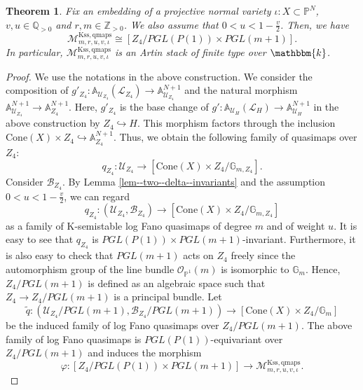 \documentclass[12pt,twoside]{amsart}
\newtheorem{thm}{Theorem}[section]
\theoremstyle{definition}
\begin{document}
\begin{thm}\label{thm--quot--stack}
    Fix an embedding of a projective normal variety $\iota\colon X\subset \mathbb{P}^N$, $v,u\in\mathbb{Q}_{>0}$ and $r,m\in\mathbb{Z}_{>0}$.
We also assume that $0<u<1-\frac{v}{2}$. Then, we have
$$\mathcal{M}^{\mathrm{Kss,qmaps}}_{m,r,u,v,\iota}\cong [Z_4/PGL(P(1))\times PGL(m+1)].$$
    In particular, $\mathcal{M}^{\mathrm{Kss,qmaps}}_{m,r,u,v,\iota}$ is an Artin stack of finite type over $\mathbbm{k}$.
\end{thm}

\begin{proof}
We use the notations in the above construction. 
We consider the composition of $g'_{Z_4}\colon\mathbb{A}_{\mathcal{U}_{Z_4}}(\mathscr{L}_{Z_4})\to \mathbb{A}_{\mathcal{U}_{Z_4}}^{N+1}$ and the natural morphism $\mathbb{A}_{\mathcal{U}_{Z_4}}^{N+1}\to \mathbb{A}_{Z_4}^{N+1}$. 
Here, $g'_{Z_4}$ is the base change of $g'\colon\mathbb{A}_{\mathcal{U}_H}(\mathscr{L}_{H})\to \mathbb{A}_{\mathcal{U}_H}^{N+1}$ in the above construction by $Z_{4} \hookrightarrow H$. 
This morphism factors through the inclusion $\mathrm{Cone}(X)\times Z_4\hookrightarrow \mathbb{A}_{Z_4}^{N+1}$.
Thus, we obtain the following family of quasimaps over $Z_4$:
\[
q_{Z_4}\colon \mathcal{U}_{Z_4}\to [\mathrm{Cone}(X)\times Z_4/\mathbb{G}_{m,Z_{4}}].
\]
Consider $\mathcal{B}_{Z_4}$.
By Lemma \ref{lem--two--delta--invariants} and the assumption $0<u<1-\frac{v}{2}$, we can regard 
\[
q_{Z_4}\colon (\mathcal{U}_{Z_4},\mathcal{B}_{Z_4})\to [\mathrm{Cone}(X)\times Z_4/\mathbb{G}_{m,Z_{4}}]
\]
as a family of K-semistable log Fano quasimaps of degree $m$ and of weight $u$.
It is easy to see that $q_{Z_4}$ is $PGL(P(1))\times PGL(m+1)$-invariant.
Furthermore, it is also easy to check that $PGL(m+1)$ acts on $Z_4$ freely since the automorphism group of the line bundle $\mathcal{O}_{\mathbb{P}^1}(m)$ is isomorphic to $\mathbb{G}_{m}$. Hence, $Z_4/PGL(m+1)$ is defined as an algebraic space such that $Z_4\to Z_4/PGL(m+1)$ is a principal bundle.
Let \[
\tilde{q}\colon(\mathcal{U}_{Z_4}/PGL(m+1),\mathcal{B}_{Z_4}/PGL(m+1))\to [\mathrm{Cone}(X)\times Z_4/\mathbb{G}_m]\]
be the induced family of log Fano quasimaps over $Z_4/PGL(m+1)$.
The above family of log Fano quasimaps is $PGL(P(1))$-equivariant over $Z_4/PGL(m+1)$ and induces the morphism 
$$\varphi\colon [Z_4/PGL(P(1))\times PGL(m+1)]\to \mathcal{M}^{\mathrm{Kss,qmaps}}_{m,r,u,v,\iota}.$$ 


\end{proof}
\end{document}
